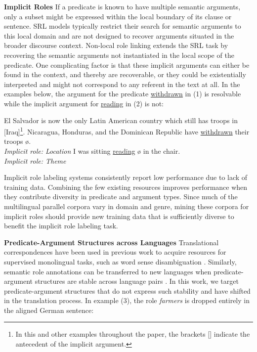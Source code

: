 \documentclass[11pt]{article}
\begin{document}
{\bf  \flushleft Implicit Roles}
If a predicate is known to have multiple semantic arguments, only a subset might be expressed within the local boundary of its clause or sentence. SRL models typically restrict their search for semantic arguments to this local domain and are not designed to recover
arguments situated in the broader discourse context. 
Non-local role linking extends the SRL task by recovering the semantic arguments not
instantiated in the local scope of the predicate. One complicating factor is that these implicit arguments can either be found in the context, and thereby are recoverable, or they could be existentially interpreted and might not correspond to any referent in the text at all. In the examples below, the argument for the predicate \underline{withdrawn} in (1) is resolvable
while the implicit argument for \underline{reading} in (2) is not:

\begin{exe}
\ex El Salvador is now the only Latin American country which still has troops in [Iraq]\footnote{In this and other examples throughout the paper, the brackets [] indicate the antecedent of the implicit argument.}. Nicaragua, Honduras, and the Dominican Republic have \underline{withdrawn} their troops {\o}.\\
\textit{Implicit role: Location}
\ex I was sitting \underline{reading} {\o} in the chair.\\
\textit{Implicit role: Theme}
\end{exe}

Implicit role labeling systems consistently report low performance 
 due to lack of training data. Combining the few existing re\-sour\-ces improves performance \cite{feizabadi2015combining} when they contribute diversity in predicate and argument types. Since much of the multilingual parallel corpora vary in domain and genre, mining these corpora for implicit roles should provide new training data that is sufficiently diverse to benefit the implicit role labeling task.

{\bf \flushleft Predicate-Argument Structures across Languages}
Translational correspondences have been used in previous work to acquire resources for supervised monolingual tasks, such as word sense disambiguation \cite{diab2002unsupervised}.
Similarly, semantic role annotations can be transferred to new languages 
when predicate-argument structures are stable across language pairs \cite{pado2009cross}. 
In this work, we target predicate-argument structures that 
do not express such stability and have shifted in the translation process. In example (3), the role \textit{farmers} is dropped entirely in the aligned German sentence:%
\end{document}
